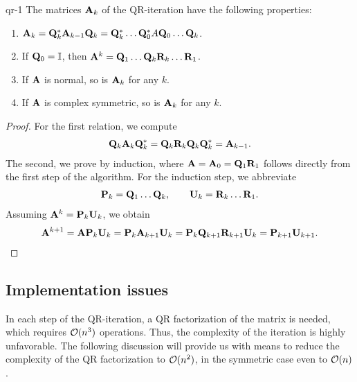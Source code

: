 \begin{Lemma}{qr-1}
  The matrices $\mathbf A_k$ of the QR-iteration have the following properties:
  \begin{enumerate}
  \item $\mathbf A_{k} = \mathbf Q_k^*\mathbf A_{k-1}\mathbf Q_k = \mathbf Q_k^*\dots\mathbf Q_0^*A\mathbf Q_0\dots\mathbf Q_k$.
  \item If $\mathbf Q_0=\mathbb I$, then $\mathbf A^k=\mathbf Q_1\dots\mathbf Q_k\mathbf R_k\dots\mathbf R_1$.
  \item If $\mathbf A$ is normal, so is $\mathbf A_k$ for any $k$.
  \item If $\mathbf A$ is complex symmetric, so is $\mathbf A_k$ for any $k$.
  \end{enumerate}
\end{Lemma}

\begin{proof}
  For the first relation, we compute
  \begin{gather}
    \mathbf Q_k\mathbf A_{k}\mathbf Q_k^* = \mathbf Q_k\mathbf R_k\mathbf Q_k\mathbf Q_k^* = \mathbf A_{k-1}.
  \end{gather}
  The second, we prove by induction, where
  $\mathbf A = \mathbf A_0 = \mathbf Q_1\mathbf R_1$ follows directly from the first
  step of the algorithm. For the induction step, we abbreviate
  \begin{gather}
    \mathbf P_k = \mathbf Q_1\dots\mathbf Q_k,\qquad \mathbf U_k = \mathbf R_k\dots\mathbf R_1.
  \end{gather}
  Assuming $\mathbf A^k = \mathbf P_k\mathbf U_k$, we obtain
  \begin{gather}
    \mathbf A^{k+1} = \mathbf A\mathbf P_k\mathbf U_k = \mathbf P_k\mathbf A_{k+1}\mathbf U_k
    = \mathbf P_k\mathbf Q_{k+1}\mathbf R_{k+1}\mathbf U_k = \mathbf P_{k+1}\mathbf U_{k+1}.
  \end{gather}
\end{proof}
\subsection{Implementation issues}
\begin{intro}
  In each step of the QR-iteration, a QR factorization of the matrix
  is needed, which requires $\mathcal O(n^3)$ operations. Thus, the
  complexity of the iteration is highly unfavorable. The following
  discussion will provide us with means to reduce the complexity of
  the QR factorization to $\mathcal O(n^2)$, in the symmetric case even to
  $\mathcal O(n)$.
\end{intro}

